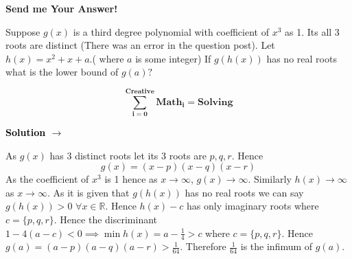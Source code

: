 \documentclass[12pt]{article}
\newcommand{\mR}{\mathbb{R}}
\newcommand\BackgroundPic{%
	\put(0,0){%
		\parbox[b][\paperheight]{\paperwidth}{%
			\vfill
			\centering
			\texttt{[image: 1.jpg]}%
			\vfill
}}}
\begin{document}
	\AddToShipoutPicture*{\BackgroundPic}
	
	\begin{center}
		
		\huge{\textbf{Send me Your Answer!}}
		
		\vspace*{1cm}
		
		
		
	\end{center}
	
	
	\Huge{Suppose $g(x)$ is a third degree polynomial with coefficient of $x^3$ as 1. Its all 3 roots are distinct (There was an error in the question post). Let $h(x)=x^2+x+a$.( where $a$ is some integer) If $g(h(x))$ has no real roots what is the lower bound of $g(a) ?$}
	
	\begin{center}
		\vspace{1cm}
		
		\Huge{$$\boldsymbol{\sum \limits_{i=0}^{Creative} Math_i = Solving}$$}
		
		\vspace{1cm}
		
		\begin{mybox}\Huge{\begin{center}\textbf{\textcolor{black}{Solution $\to$}} \end{center}}\end{mybox}
	\end{center}
	\pagebreak 
	
	As $g(x)$ has 3 distinct roots let its 3 roots are $p,q,r$. Hence $$g(x)=(x-p)(x-q)(x-r)$$As the coefficient of $x^3$ is 1 hence as $x\to \infty$, $g(x)\to \infty$. Similarly $h(x)\to \infty$ as $x\to\infty$. As it is given that $g(h(x))$ has no real roots we can say $g(h(x))>0$ $\forall x\in\mR$. Hence $h(x)-c$ has only imaginary roots where $c=\{p,q,r\}$. Hence the discriminant $1-4(a-c)<0\implies \min h(x)=a-\frac14 >c$ where $c=\{p,q,r\}$. Hence   $g(a)=(a-p)(a-q)(a-r)>\frac1{64}$. Therefore $\frac1{64}$ is the infimum of $g(a)$.
\end{document}
